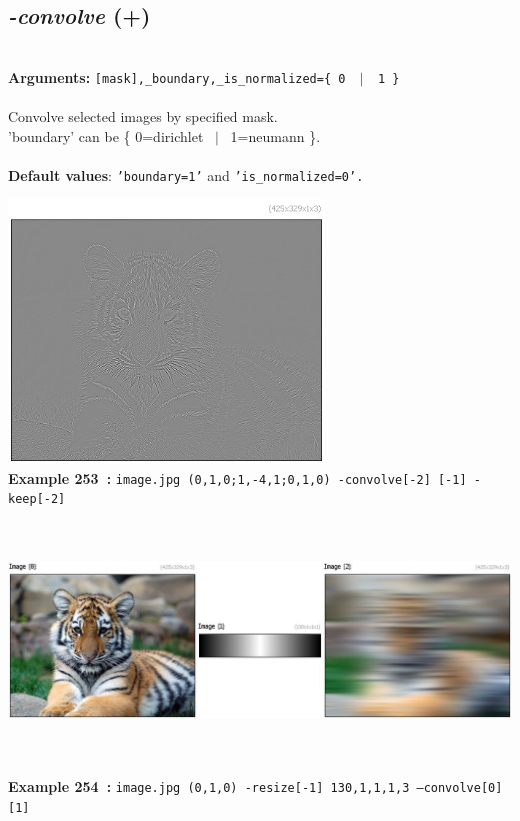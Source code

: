 \documentclass[a4paper,11pt,twoside]{book}
\begin{document}
\subsection{\emph{-convolve} (+)}\vspace*{-0.5em}
~\\\textbf{Arguments: } 
{\small \texttt{[mask],\_boundary,\_is\_normalized=\{ 0 ~$|$~ 1 \}}}\\~\\
Convolve selected images by specified mask.
~\\'boundary' can be \{ 0=dirichlet ~$|$~ 1=neumann \}.
~\\~\\\textbf{Default values}: {\small \texttt{'boundary=1'} and \texttt{'is\_normalized=0'.}}
\begin{center}\includegraphics[keepaspectratio=true,height=7cm,width=\textwidth]{img/gmic_def253.jpg}\\
{\footnotesize \textbf{Example 253~:} \texttt{image.jpg (0,1,0;1,-4,1;0,1,0) -convolve[-2] [-1] -keep[-2]}}
\\\includegraphics[keepaspectratio=true,height=7cm,width=\textwidth]{img/gmic_def254.jpg}\\
{\footnotesize \textbf{Example 254~:} \texttt{image.jpg (0,1,0) -resize[-1] 130,1,1,1,3 --convolve[0] [1]}}
\end{center}
\end{document}
